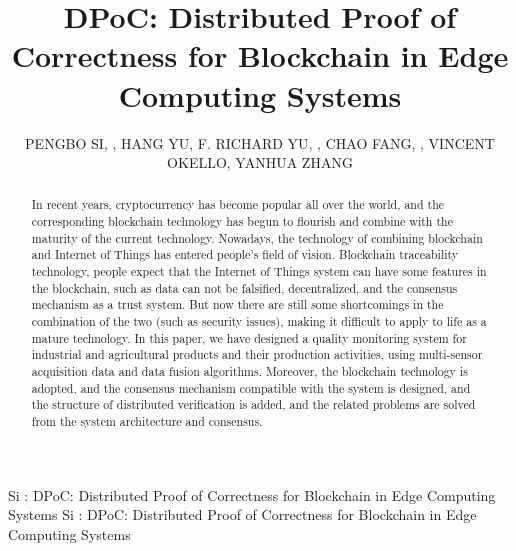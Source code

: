 \documentclass{ieeeaccess}
\begin{document}

\title{DPoC: Distributed Proof of Correctness for Blockchain in Edge Computing Systems}
\author{\uppercase{Pengbo Si}, ,
\uppercase{Hang Yu}, 
\uppercase{F. Richard Yu}, ,
\uppercase{Chao Fang}, ,
\uppercase{Vincent Okello},
\uppercase{Yanhua Zhang}
\address[1]{Faculty of Information Technology, Beijing University of Technology, Beijing 100124  China}
\address[2]{Beijing Advanced Innovation Center for Future Internet Technology, Beijing University of Technology, Beijing 100124 China}
\address[3]{Department of Systems and Computer Engineering, Carleton University, Ottawa, ON K1S 5B6, Canada}
\address[4]{College of International Education, Beijing University of Technology, Beijing 100124 China}}

\markboth
{Si \headeretal: DPoC: Distributed Proof of Correctness for Blockchain in Edge Computing Systems}
{Si \headeretal: DPoC: Distributed Proof of Correctness for Blockchain in Edge Computing Systems}


\begin{abstract}
In recent years, cryptocurrency has become popular all over the world, and the corresponding blockchain technology has begun to flourish and combine with the maturity of the current technology. Nowadays, the technology of combining blockchain and Internet of Things has entered people's field of vision. Blockchain traceability technology, people expect that the Internet of Things system can have some features in the blockchain, such as data can not be falsified, decentralized, and the consensus mechanism as a trust system. But now there are still some shortcomings in the combination of the two (such as security issues), making it difficult to apply to life as a mature technology. In this paper, we have designed a quality monitoring system for industrial and agricultural products and their production activities, using multi-sensor acquisition data and data fusion algorithms. Moreover, the blockchain technology is adopted, and the consensus mechanism compatible with the system is designed, and the structure of distributed verification is added, and the related problems are solved from the system architecture and consensus.
\end{abstract}
\end{document}
